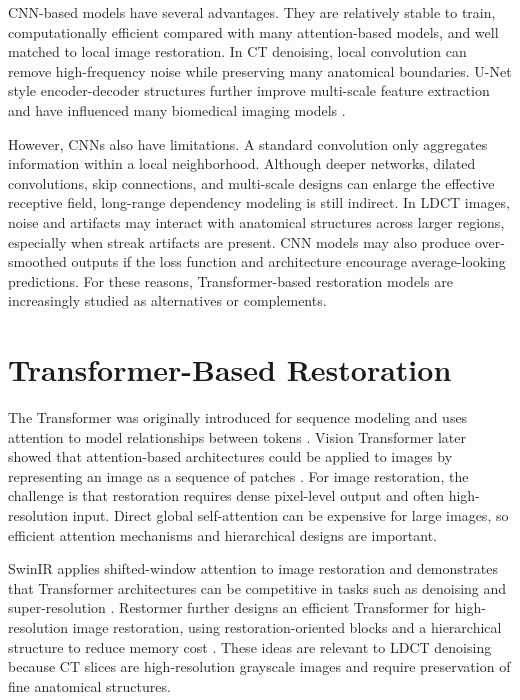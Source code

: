CNN-based models have several advantages. They are relatively stable to train, computationally efficient compared with many attention-based models, and well matched to local image restoration. In CT denoising, local convolution can remove high-frequency noise while preserving many anatomical boundaries. U-Net style encoder-decoder structures further improve multi-scale feature extraction and have influenced many biomedical imaging models \cite{unet}.

However, CNNs also have limitations. A standard convolution only aggregates information within a local neighborhood. Although deeper networks, dilated convolutions, skip connections, and multi-scale designs can enlarge the effective receptive field, long-range dependency modeling is still indirect. In LDCT images, noise and artifacts may interact with anatomical structures across larger regions, especially when streak artifacts are present. CNN models may also produce over-smoothed outputs if the loss function and architecture encourage average-looking predictions. For these reasons, Transformer-based restoration models are increasingly studied as alternatives or complements.

\section{Transformer-Based Restoration}

The Transformer was originally introduced for sequence modeling and uses attention to model relationships between tokens \cite{attention}. Vision Transformer later showed that attention-based architectures could be applied to images by representing an image as a sequence of patches \cite{vit}. For image restoration, the challenge is that restoration requires dense pixel-level output and often high-resolution input. Direct global self-attention can be expensive for large images, so efficient attention mechanisms and hierarchical designs are important.

SwinIR applies shifted-window attention to image restoration and demonstrates that Transformer architectures can be competitive in tasks such as denoising and super-resolution \cite{swinir}. Restormer further designs an efficient Transformer for high-resolution image restoration, using restoration-oriented blocks and a hierarchical structure to reduce memory cost \cite{restormer}. These ideas are relevant to LDCT denoising because CT slices are high-resolution grayscale images and require preservation of fine anatomical structures.

